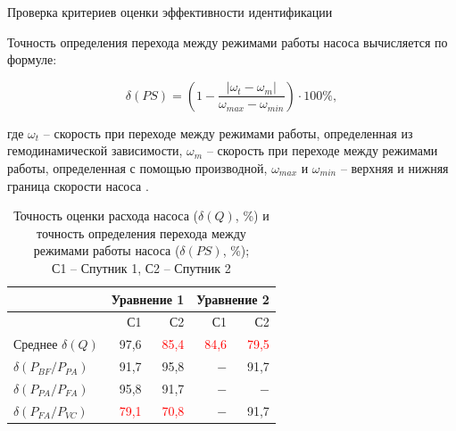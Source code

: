 \documentclass[a4paper, 9pt]{beamer}
\begin{document}
\begin{frame}{Проверка критериев оценки эффективности идентификации}
\begin{minipage}[ht]{0.48\textwidth}
\tiny Точность определения перехода между режимами работы насоса вычисляется по формуле:

\begin{equation} \tag{2}
	\delta(PS) = \left(1 - \frac{\lvert \omega_t - \omega_m \rvert}{\omega_{max} - \omega_{min}} \right) \cdot 100\%,
\end{equation}

где $\omega_t$ -- скорость при переходе между режимами работы, определенная из гемодинамической зависимости, $\omega_m$ -- скорость при переходе между режимами работы, определенная с помощью производной, $\omega_{max}$ и $\omega_{min}$ -- верхняя и нижняя граница скорости насоса \footnotemark[1].

\vskip-10pt
\setcounter{table}{0}
\begin{table}
\caption{\scriptsize Точность оценки расхода насоса ($\delta(Q)$, \%) и точность определения перехода между режимами работы насоса ($\delta(PS)$, \%); \\ С1 -- Спутник 1, С2 -- Спутник 2}\vskip-3pt
\begin{tabular}{lrrrr}
\toprule
 & \multicolumn{2}{c}{Уравнение 1} & \multicolumn{2}{c}{Уравнение 2} \\
\midrule
    	& С1 & С2 & С1 & С2 \\
		\midrule
		Среднее $\delta(Q)$ & 97,6 & \textcolor{red}{85,4} & \textcolor{red}{84,6}	&	\textcolor{red}{79,5} \\
\midrule
$\delta(P_{BF}/P_{PA})$		& 	91,7								&	95,8									&	$-$	& 91,7	\\
$\delta(P_{PA}/P_{FA})$		& 95,8								&	91,7									&	$-$	& $-$ \\
$\delta(P_{FA}/P_{VC})$		& 	\textcolor{red}{79,1}	& \textcolor{red}{70,8}		& $-$	& 91,7 \\

\bottomrule
\end{tabular}
\end{table}

\end{minipage}

\vskip-3pt



\end{frame}
\end{document}
